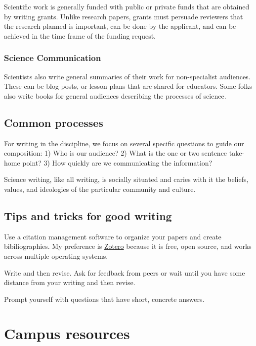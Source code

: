 \documentclass[11pt,]{article}
\begin{document}
Scientific work is generally funded with public or private funds that
are obtained by writing grants. Unlike research papers, grants must
persuade reviewers that the research planned is important, can be done
by the applicant, and can be achieved in the time frame of the funding
request.

\hypertarget{science-communication}{%
\subsubsection{Science Communication}\label{science-communication}}

Scientists also write general summaries of their work for non-specialist
audiences. These can be blog posts, or lesson plans that are shared for
educators. Some folks also write books for general audiences describing
the processes of science.

\hypertarget{common-processes}{%
\subsection{Common processes}\label{common-processes}}

For writing in the discipline, we focus on several specific questions to
guide our composition: 1) Who is our audience? 2) What is the one or two
sentence take-home point? 3) How quickly are we communicating the
information?

Science writing, like all writing, is socially situated and caries with
it the beliefs, values, and ideologies of the particular community and
culture.

\hypertarget{tips-and-tricks-for-good-writing}{%
\subsection{Tips and tricks for good
writing}\label{tips-and-tricks-for-good-writing}}

Use a citation management software to organize your papers and create
bibiliographies. My preference is \href{https://www.zotero.org/}{Zotero}
because it is free, open source, and works across multiple operating
systems.

Write and then revise. Ask for feedback from peers or wait until you
have some distance from your writing and then revise.

Prompt yourself with questions that have short, concrete answers.

\newpage

\hypertarget{campus-resources}{%
\section{Campus resources}\label{campus-resources}}
\end{document}
